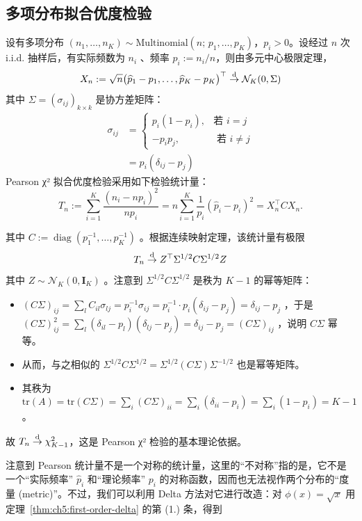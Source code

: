 \subsection{多项分布拟合优度检验}
 
\begin{example}
设有多项分布 $(n_1,\dots,n_K) \sim \text{Multinomial}(n;\,p_1,\dots,p_K)$，$p_i>0$。设经过 $n$ 次 i.i.d. 抽样后，有实际频数为 $n_i$ 、频率 $\widehat{p}_i := n_i/n$，则由多元中心极限定理，
\[X_n := \sqrt{n}\bigl(\widehat{p}_1-p_1,\dots,\widehat{p}_K-p_K\bigr)^\top \overset{\rm d}\to \mathcal{N}_K(0,\Sigma)\]
其中 $\Sigma = (\sigma_{ij})_{k\times k}$ 是协方差矩阵：
\[\begin{aligned} \sigma_{ij}&=\begin{cases} p_i(1-p_i),&\text  {若 }i=j\\ -p_ip_j,&\text{ 若 }i\ne j \end{cases}\\ &=p_i(\delta_{ij}-p_j) \end{aligned}\]
Pearson χ² 拟合优度检验采用如下检验统计量：
\[
T_n := \sum_{i=1}^K \frac{(n_i-np_i)^2}{np_i} = n\sum_{i=1}^K \frac{1}{p_i}(\widehat{p}_i-p_i)^2 = X_n^\top C X_n.
\]

其中 $C := \operatorname{diag}(p_1^{-1},\dots,p_K^{-1})$ 。根据连续映射定理，该统计量有极限
\[T_n \overset{\rm d}\to Z^\top \Sigma^{1/2} C \Sigma^{1/2} Z\]
其中 $Z\sim \mathcal N_K(0,\mathbf I_K)$ 。注意到 $\Sigma^{1/2}C\Sigma^{1/2}$ 是秩为 $K-1$ 的幂等矩阵：

\begin{itemize}
\tightlist
\item
  $(C\Sigma)_{ij} = \sum_{l} C_{il} \sigma_{lj} = p_i^{-1} \sigma_{ij} = p_i^{-1} \cdot p_i(\delta_{ij}-p_j) = \delta_{ij} - p_j$ ，于是 $(C\Sigma)^2_{ij} = \sum_l (\delta_{il}-p_l)(\delta_{lj}-p_j)=\delta_{ij}-p_j=(C\Sigma)_{ij}$ ，说明 $C\Sigma$ 幂等。
\item
  从而，与之相似的 $\Sigma^{1/2}C\Sigma^{1/2} = \Sigma^{1/2} (C\Sigma) \Sigma^{-1/2}$ 也是幂等矩阵。
\item
  其秩为 $\mathrm{tr}(A) = \mathrm{tr}(C\Sigma)=\sum_i (C\Sigma)_{ii} = \sum_i (\delta_{ii} - p_i) = \sum_i (1 - p_i) = K - 1$ 。
\end{itemize}

故 $T_n \overset{\rm d}\to \chi_{K-1}^2$，这是 Pearson χ² 检验的基本理论依据。
\end{example}
注意到 Pearson 统计量不是一个对称的统计量，这里的``不对称''指的是，它不是一个``实际频率'' $\widehat p_i$ 和``理论频率'' $p_i$ 的对称函数，因而也无法视作两个分布的``度量 (metric)''。不过，我们可以利用 Delta 方法对它进行改造：对 $\phi(x)=\sqrt x$ 用定理~\ref{thm:ch5:first-order-delta} 的第 (1.) 条，得到
